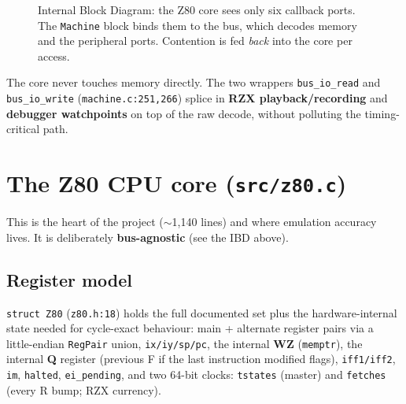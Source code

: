 \documentclass[11pt,a4paper]{article}
\begin{document}
\begin{figure}[h]
\caption{Internal Block Diagram: the Z80 core sees only six callback ports.
The \texttt{Machine} block binds them to the bus, which decodes memory and the
peripheral ports. Contention is fed \emph{back} into the core per access.}
\end{figure}

The core never touches memory directly. The two wrappers \texttt{bus\_io\_read}
and \texttt{bus\_io\_write} (\texttt{machine.c:251,266}) splice in
\textbf{RZX playback/recording} and \textbf{debugger watchpoints} on top of the
raw decode, without polluting the timing-critical path.

\section{The Z80 CPU core (\texttt{src/z80.c})}

This is the heart of the project ($\sim$1{,}140 lines) and where emulation
accuracy lives. It is deliberately \textbf{bus-agnostic} (see the IBD above).

\subsection{Register model}
\texttt{struct Z80} (\texttt{z80.h:18}) holds the full documented set plus the
hardware-internal state needed for cycle-exact behaviour: main + alternate
register pairs via a little-endian \texttt{RegPair} union, \texttt{ix/iy/sp/pc},
the internal \textbf{WZ} (\texttt{memptr}), the internal \textbf{Q} register
(previous F if the last instruction modified flags), \texttt{iff1/iff2},
\texttt{im}, \texttt{halted}, \texttt{ei\_pending}, and two 64-bit clocks:
\texttt{tstates} (master) and \texttt{fetches} (every R bump; RZX currency).
\end{document}
